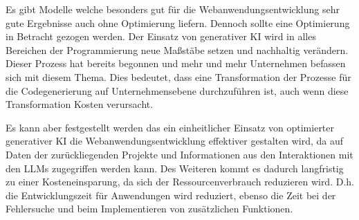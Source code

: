 Es gibt Modelle welche besonders gut für die Webanwendungsentwicklung sehr gute Ergebnisse auch ohne Optimierung liefern. Dennoch sollte eine Optimierung in Betracht gezogen werden. Der Einsatz von generativer KI wird in alles Bereichen der Programmierung neue Maßstäbe setzen und nachhaltig verändern. Dieser Prozess hat bereits begonnen und mehr und mehr Unternehmen befassen sich mit diesem Thema. Dies bedeutet, dass eine Transformation der Prozesse für die Codegenerierung auf Unternehmensebene durchzuführen ist, auch wenn diese Transformation Kosten verursacht.\vspace{0.2cm}

Es kann aber festgestellt werden das ein einheitlicher Einsatz von optimierter generativer KI die Webanwendungsentwicklung effektiver gestalten wird, da auf Daten der zurückliegenden Projekte und Informationen aus den Interaktionen mit den LLMs zugegriffen werden kann. Des Weiteren kommt es dadurch langfristig zu einer Kosteneinsparung, da sich der Ressourcenverbrauch reduzieren wird. D.h. die Entwicklungszeit für Anwendungen wird reduziert, ebenso die Zeit bei der Fehlersuche und beim Implementieren von zusätzlichen Funktionen.